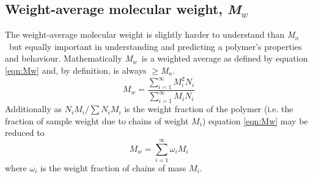 \documentclass[11pt]{article}
\newcommand{\Mn}{\emph{M}$_n$}
\newcommand{\Mw}{\emph{M}$_w$}
\begin{document}
\subsection{Weight-average molecular weight, \Mw}
The weight-average molecular weight is slightly harder to understand than \Mn\ but equally important in understanding and predicting a polymer's properties and behaviour. Mathematically \Mw\ is a weighted average as defined by equation \ref{eqn:Mw} and, by definition, is always $\geq$\Mn. 
\begin{equation}
\label{eqn:Mw}
M_w  =  \frac{\displaystyle{
\sum_{i=1}^\infty{M_i^2 N_i}}}{\displaystyle{\sum_{i=1}^\infty{M_i N_i}}}
\end{equation}
Additionally as $N_i M_i/\sum{N_i M_i}$ is the weight fraction of the polymer (i.e. the fraction of sample weight due to chains of weight $M_i$) equation \ref{eqn:Mw} may be reduced to
\begin{equation}
\label{eqn:Mw2}
M_w = \displaystyle{
\sum_{i=1}^\infty{{\omega}_i M_i}}
\end{equation}
where $\omega_i$ is the weight fraction of chains of mass $M_i$.
\end{document}
